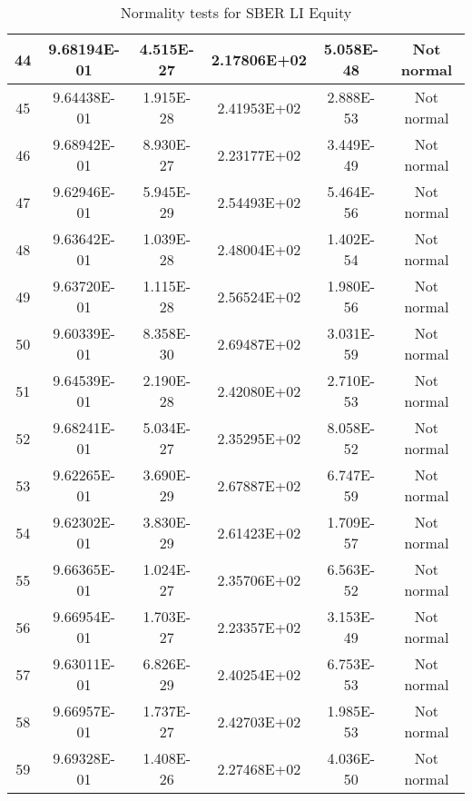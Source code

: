 \begin{table}[h]
\begin{tabular}{|c|c|c|c|c|c|}
		44 & 9.68194E-01 & 4.515E-27 & 2.17806E+02 & 5.058E-48 & Not normal\\\hline
		45 & 9.64438E-01 & 1.915E-28 & 2.41953E+02 & 2.888E-53 & Not normal\\\hline
		46 & 9.68942E-01 & 8.930E-27 & 2.23177E+02 & 3.449E-49 & Not normal\\\hline
		47 & 9.62946E-01 & 5.945E-29 & 2.54493E+02 & 5.464E-56 & Not normal\\\hline
		48 & 9.63642E-01 & 1.039E-28 & 2.48004E+02 & 1.402E-54 & Not normal\\\hline
		49 & 9.63720E-01 & 1.115E-28 & 2.56524E+02 & 1.980E-56 & Not normal\\\hline
		50 & 9.60339E-01 & 8.358E-30 & 2.69487E+02 & 3.031E-59 & Not normal\\\hline
		51 & 9.64539E-01 & 2.190E-28 & 2.42080E+02 & 2.710E-53 & Not normal\\\hline
		52 & 9.68241E-01 & 5.034E-27 & 2.35295E+02 & 8.058E-52 & Not normal\\\hline
		53 & 9.62265E-01 & 3.690E-29 & 2.67887E+02 & 6.747E-59 & Not normal\\\hline
		54 & 9.62302E-01 & 3.830E-29 & 2.61423E+02 & 1.709E-57 & Not normal\\\hline
		55 & 9.66365E-01 & 1.024E-27 & 2.35706E+02 & 6.563E-52 & Not normal\\\hline
		56 & 9.66954E-01 & 1.703E-27 & 2.23357E+02 & 3.153E-49 & Not normal\\\hline
		57 & 9.63011E-01 & 6.826E-29 & 2.40254E+02 & 6.753E-53 & Not normal\\\hline
		58 & 9.66957E-01 & 1.737E-27 & 2.42703E+02 & 1.985E-53 & Not normal\\\hline
		59 & 9.69328E-01 & 1.408E-26 & 2.27468E+02 & 4.036E-50 & Not normal\\\hline
	\end{tabular}
	\caption{Normality tests for SBER LI Equity}
	\label{tab:normality_tests_SBER_LI}
\end{table}

